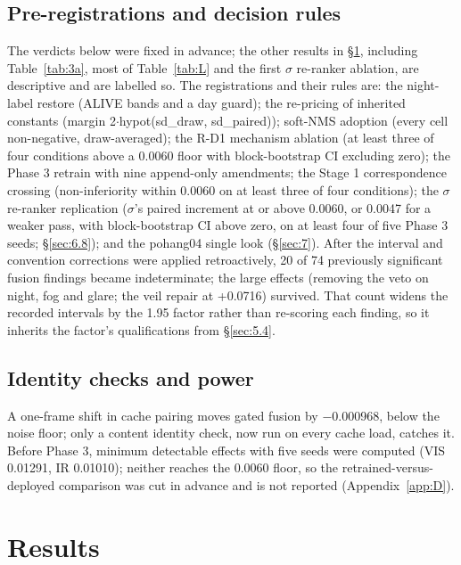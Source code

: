 \documentclass[10pt]{article}
\begin{document}
\subsection{Pre-registrations and decision rules}\label{sec:5.7}
The verdicts below were fixed in advance; the other results in \S\ref{sec:6}, including Table~\ref{tab:3a}, most of Table~\ref{tab:L} and the first $\sigma$ re-ranker ablation, are descriptive and are labelled so. The registrations and their rules are: the night-label restore (ALIVE bands and a day guard); the re-pricing of inherited constants (margin 2$\cdot$hypot(sd\_draw, sd\_paired)); soft-NMS \citep{bodla2017softnms} adoption (every cell non-negative, draw-averaged); the R-D1 mechanism ablation (at least three of four conditions above a 0.0060 floor with block-bootstrap CI excluding zero); the Phase 3 retrain with nine append-only amendments; the Stage 1 correspondence crossing (non-inferiority within 0.0060 on at least three of four conditions); the $\sigma$ re-ranker replication ($\sigma$'s paired increment at or above 0.0060, or 0.0047 for a weaker pass, with block-bootstrap CI above zero, on at least four of five Phase 3 seeds; \S\ref{sec:6.8}); and the pohang04 single look (\S\ref{sec:7}). After the interval and convention corrections were applied retroactively, 20 of 74 previously significant fusion findings became indeterminate; the large effects (removing the veto on night, fog and glare; the veil repair at +0.0716) survived. That count widens the recorded intervals by the 1.95 factor rather than re-scoring each finding, so it inherits the factor's qualifications from \S\ref{sec:5.4}.

\subsection{Identity checks and power}\label{sec:5.8}
A one-frame shift in cache pairing moves gated fusion by $-$0.000968, below the noise floor; only a content identity check, now run on every cache load, catches it. Before Phase 3, minimum detectable effects with five seeds were computed (VIS 0.01291, IR 0.01010); neither reaches the 0.0060 floor, so the retrained-versus-deployed comparison was cut in advance and is not reported (Appendix~\ref{app:D}).

\section{Results}\label{sec:6}
\end{document}
